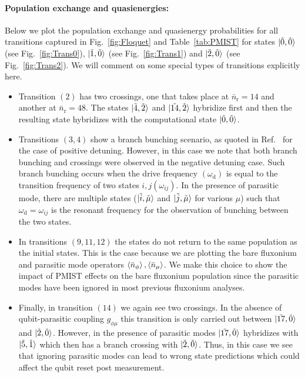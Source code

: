 \documentclass[%
reprint,
superscriptaddress,
 amsmath,amssymb,
 aps,
 prx,
longbibliography,
floatfix,
]{revtex4-2}
\begin{document}
{\paragraph{Population exchange and quasienergies:}\label{app:Floquet-trans}
Below we plot the population exchange and quasienergy probabilities for all transitions captured in Fig.~\ref{fig:Floquet} and Table~\ref{tab:PMIST} for states $\ket{\tilde{0},\tilde{0}}$ (see Fig.~\ref{fig:Trans0}), $\ket{\tilde{1},\tilde{0}}$ (see Fig.~\ref{fig:Trans1}) and $\ket{\tilde{2},\tilde{0}}$ (see Fig.~\ref{fig:Trans2}). We will comment on some special types of transitions explicitly here.

\begin{itemize}
    \item Transition $(2)$ has two crossings, one that takes place at $\bar n_\textrm{r}=14$ and another at $\bar n_\textrm{r}=48$. The states $\ket{\tilde{4},\tilde{2}}$ and $\ket{\tilde{14},\tilde{2}}$ hybridize first and then the resulting state hybridizes with the computational state $\ket{\tilde{0},\tilde{0}}$.
    \item Transitions $(3,4)$ show a branch bunching scenario, as quoted in Ref.~\cite{dumas2024unified} for the case of positive detuning. However, in this case we note that both branch bunching and crossings were observed in the negative detuning case. Such branch bunching occurs when the drive frequency $(\omega_\textrm{d})$ is equal to the transition frequency of two states $i,j (\omega_{ij})$. In the presence of parasitic mode, there are multiple states ($\ket{\tilde{i},\tilde{\mu
    }}$ and $\ket{\tilde{j},\tilde{\mu}}$ for various $\mu$) such that $\omega_\textrm{d}=\omega_{ij}$ is the resonant frequency for the observation of bunching between the two states.
    \item In transitions $(9,11,12)$ the states do not return to the same population as the initial states. This is the case because we are plotting the bare fluxonium and parasitic mode operators $\braket{\bar n_\phi},\braket{\bar n_\mu}$. We make this choice to show the impact of PMIST effects on the bare fluxonium population since the parasitic modes have been ignored in most previous fluxonium analyses.
    \item Finally, in transition $(14)$ we again see two crossings. In the absence of qubit-parasitic coupling $g_{\phi\mu}$ this transition is only carried out between  $\ket{\tilde{17},\tilde{0}}$ and $\ket{\tilde{2},\tilde{0}}$. However, in the presence of parasitic modes $\ket{\tilde{17},\tilde{0}}$ hybridizes with $\ket{\tilde{5},\tilde{1}}$ which then has a branch crossing with $\ket{\tilde{2},\tilde{0}}$. Thus, in this case we see that ignoring parasitic modes can lead to wrong state predictions which could affect the qubit reset post measurement.
\end{itemize}

}
\end{document}
